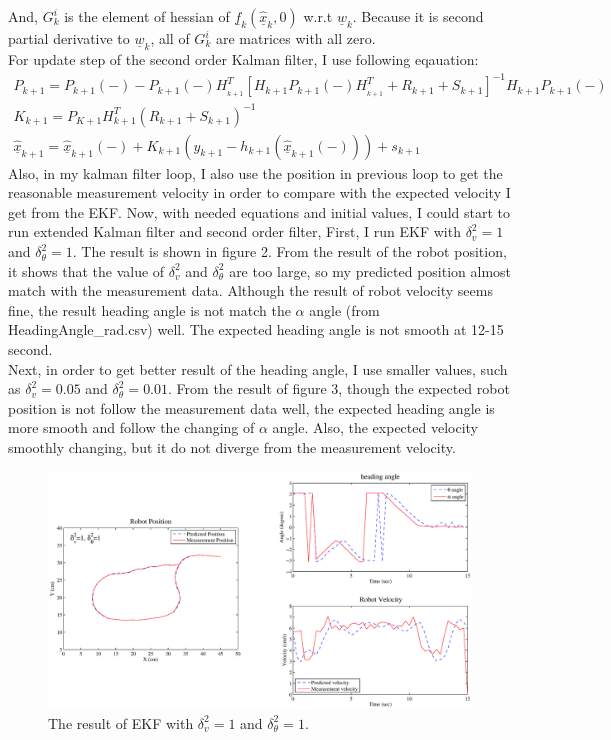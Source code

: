 \documentclass{article}
\begin{document}
And, $G_k^i$ is the element of hessian of $\underline{f}_k(\underline{\hat{x}}_k, 0)$ w.r.t $\underline{w}_k$. 
Because it is second partial derivative to $\underline{w}_k$, all of $G_k^i$ are matrices with all zero. \\
For update step of the second order Kalman filter, I use following eqauation:
\begin{eqnarray}
P_{k + 1}  = P_{k + 1} ( - ) - P_{k + 1} ( - )H_{_{k + 1} }^T \left[ {H_{k + 1} P_{k + 1} ( - )H_{_{k + 1} }^T  + R_{k + 1}  + S_{k + 1} } \right]^{ - 1} H_{k + 1} P_{k + 1} ( - ) \\
K_{k + 1}  = P_{K + 1} H_{k + 1}^T (R_{k + 1}  + S_{k + 1} )^{ - 1} \\
\underline{\hat x}_{k + 1}  = \underline{\hat x}_{k + 1} ( - ) + K_{k + 1} (y_{k + 1}  - h_{k + 1} (\underline{\hat x}_{k + 1} ( - ))) + s_{k + 1}
\end{eqnarray}
Also, in my kalman filter loop, I also use the position in previous loop to get the reasonable measurement velocity in 
order to compare with the expected velocity I get from the EKF. 
Now, with needed equations and initial values, I could start to run extended Kalman filter and second order filter, 
First, I run EKF with $\delta_v^2=1$ and $\delta_\theta^2=1$. The result is shown in figure 2. From the result of 
the robot position, it shows that the value of $\delta_v^2$ and $\delta_\theta^2$ are too large, so my predicted 
position almost match with the measurement data. Although the result of robot velocity seems fine, the result 
heading angle is not match the $\alpha$ angle (from HeadingAngle\_rad.csv) well. The expected heading angle is not
smooth at 12-15 second.\\
Next, in order to get better result of the heading angle, I use smaller values, such as $\delta_v^2=0.05$ and 
$\delta_\theta^2=0.01$. From the result of figure 3, though the expected robot position is not follow the 
measurement data well, the expected heading angle is more smooth and follow the changing of $\alpha$ angle.
Also, the expected velocity smoothly changing, but it do not diverge from the measurement velocity. 
 \begin{figure}[H]
	 \begin{center}
	 	\includegraphics[width=\textwidth]{EKF_v1_w1.eps}
	 	\caption{The result of EKF with $\delta_v^2=1$ and $\delta_\theta^2=1$.}
	 \end{center}
 \end{figure}
\end{document}
